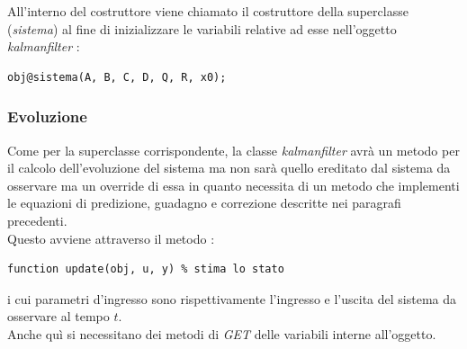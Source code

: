 All'interno del costruttore viene chiamato il costruttore della superclasse (\textit{sistema}) al fine di inizializzare le variabili relative ad esse nell'oggetto \textit{kalmanfilter} :
\begin{lstlisting}[frame=single]
	obj@sistema(A, B, C, D, Q, R, x0);
\end{lstlisting}

\subsubsection{Evoluzione}
Come per la superclasse corrispondente, la classe \textit{kalmanfilter} avrà un metodo per il calcolo dell'evoluzione del sistema ma non sarà quello ereditato dal sistema da osservare ma un override di essa in quanto necessita di un metodo che implementi le equazioni di predizione, guadagno e correzione descritte nei paragrafi precedenti.\\
Questo avviene attraverso il metodo :
\begin{lstlisting}[frame=single]
function update(obj, u, y) % stima lo stato
\end{lstlisting}
i cui parametri d'ingresso sono rispettivamente l'ingresso e l'uscita del sistema da osservare al tempo $t$.\\
Anche quì si necessitano dei metodi di \textit{GET} delle variabili interne all'oggetto.
\newpage

